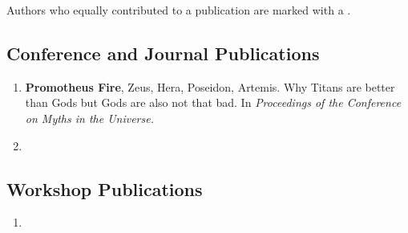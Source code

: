 Authors who equally contributed to a publication are marked with a \textdagger.

\subsection{Conference and Journal Publications}

\begin{enumerate}
 \item \textbf{Promotheus Fire}\ec, Zeus\ec, Hera, Poseidon, Artemis. Why Titans are better than Gods but Gods are also not that bad. In \textit{Proceedings of the  Conference on Myths in the Universe.}
 \item \lipsum[1][1-3]
 \setcounter{publicationCounter}{\value{enumi}} %
\end{enumerate}

\subsection{Workshop Publications}
\begin{enumerate}
 \setcounter{enumi}{\value{publicationCounter}} %
 \item \lipsum[1][4-7]
 \setcounter{publicationCounter}{\value{enumi}} %
\end{enumerate}

